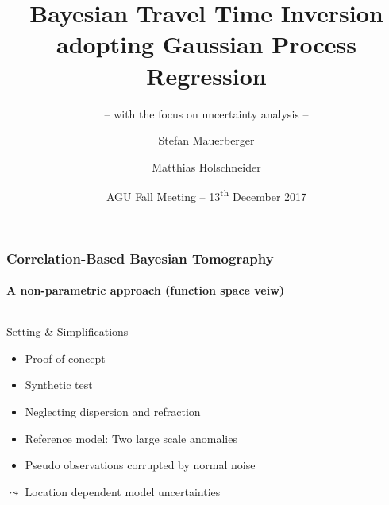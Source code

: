 \documentclass[aspectratio=169, t, 10pt]{beamer}
\title[Correlation based travel time inversion]{Bayesian Travel Time Inversion adopting Gaussian Process Regression}
\subtitle{-- with the focus on uncertainty analysis --}
\author[\tt mauerber@uni-potsdam.de]{Stefan Mauerberger \and Matthias Holschneider}
\institute[Math@UP]{University Potsdam, Institute of Mathematics}
\date[AGU~2017]{AGU Fall Meeting -- 13\textsuperscript{th} December 2017}
\begin{document}



\begin{frame}
    \frametitle{Correlation-Based Bayesian Tomography}
    \framesubtitle{A non-parametric approach (function space veiw)}

\begin{columns}%
%

    \begin{exampleblock}{Setting \& Simplifications}
        \begin{itemize}
            \item Proof of concept
            \item Synthetic test
            \item Neglecting dispersion and refraction
            \item Reference model: Two large scale anomalies
            \item Pseudo observations corrupted by normal noise
        \end{itemize}
        \hfill {\Large $\leadsto$} Location dependent model uncertainties ~
    \end{exampleblock}


    \vspace{-10mm}
\end{columns}

\end{frame}
\end{document}

